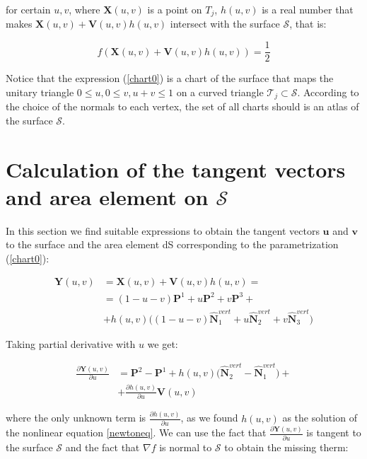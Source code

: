 \documentclass[11pt, oneside]{article}
\newcommand\bP{\boldsymbol P}
\newcommand\bN{\boldsymbol N}
\newcommand\bX{\boldsymbol X}
\newcommand\bY{\boldsymbol Y}
\newcommand\bV{\boldsymbol V}
\newcommand\bu{\boldsymbol u}
\newcommand\bv{\boldsymbol v}
\begin{document}
for certain $u,v$, where $\bX(u,v)$ is a point on $\mathit{T}_j$, $h(u,v)$ is a real number that makes $\bX(u,v)+\bV(u,v)h(u,v)$ intersect with the surface $\mathcal{S}$, that is:

\begin{equation}\label{newtoneq}
f(\bX(u,v)+\bV(u,v)h(u,v))=\frac{1}{2}
\end{equation}
 
Notice that the expression (\ref{chart0}) is a chart of the surface that maps the unitary triangle $0\le u, 0\le v, u+v\le1$ on a curved triangle $\mathcal{T}_j\subset \mathcal{S}$. According to the choice of the normals to each vertex, the set of all charts should is an atlas of the surface $\mathcal{S}$.









\section{Calculation of the tangent vectors and area element on $\mathcal{S}$}

In this section we find suitable expressions to obtain the tangent vectors $\bu$ and $\bv$ to the surface and the area element dS corresponding to the parametrization (\ref{chart0}):

\begin{equation}\label{chart}
\begin{aligned}
\bY(u,v)&=\bX(u,v)+\bV(u,v)h(u,v)=\\
&=(1-u-v)\bP^1+u\bP^2+v\bP^3+\\
&+h(u,v)\Big((1-u-v)\hat{\bN}^{vert}_1+u\hat{\bN}^{vert}_2+v\hat{\bN}^{vert}_3\Big)
\end{aligned}
\end{equation}

Taking partial derivative with $u$ we get:

\begin{equation}\label{U_vector}
\begin{aligned}
\frac{\partial\bY(u,v)}{\partial u}&=\bP^2-\bP^1+h(u,v)\Big(\hat{\bN}^{vert}_2-\hat{\bN}^{vert}_1\Big)+\\
&+\frac{\partial h(u,v)}{\partial u}\bV(u,v)
\end{aligned}
\end{equation}

where the only unknown term is $\frac{\partial h(u,v)}{\partial u}$, as we found $h(u,v)$ as the solution of the nonlinear equation \ref{newtoneq}. We can use the fact that $\frac{\partial\bY(u,v)}{\partial u}$ is tangent to the surface $\mathcal{S}$ and the fact that $\nabla f$ is normal to $\mathcal{S}$ to obtain the missing therm:
\end{document}
